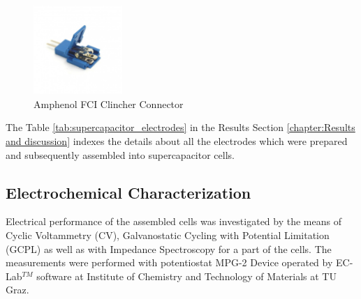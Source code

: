\begin{figure}[H]
\centering
\includegraphics[width=0.3\textwidth]{Figures/ExperimentalSetup/amphenol-fci-clincher-connector-2-position-male.jpg}
\medskip
\caption{Amphenol FCI Clincher Connector \cite{Amphenol}}
\label{fig:SC_Amphenol_terminals}
\end{figure}



The Table \ref{tab:supercapacitor_electrodes} in the Results Section \ref{chapter:Results and discussion} indexes the details about all the  electrodes which were prepared and subsequently assembled into supercapacitor cells.

\subsection{Electrochemical Characterization}
Electrical performance of the assembled cells was investigated by the means of Cyclic Voltammetry (CV), Galvanostatic Cycling with  Potential Limitation (GCPL) as well as with Impedance Spectroscopy for a part of the cells. The measurements were performed with potentiostat MPG-2 Device operated by EC-Lab$^{TM}$ software at Institute of Chemistry and Technology of Materials at TU Graz.

